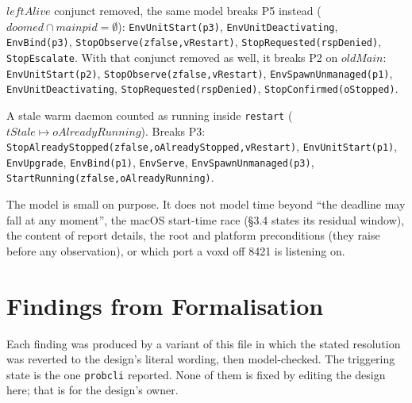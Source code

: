 \documentclass[a4paper,10pt,fleqn]{article}
\begin{document}
\begin{description}
    $leftAlive$ conjunct removed, the same model breaks P5 instead
    ($doomed \cap mainpid = \emptyset$): \texttt{EnvUnitStart(p3)},
    \texttt{EnvUnitDeactivating}, \texttt{EnvBind(p3)},
    \texttt{StopObserve(zfalse,vRestart)}, \texttt{StopRequested(rspDenied)},
    \texttt{StopEscalate}. With that conjunct removed as well, it breaks P2
    on $oldMain$: \texttt{EnvUnitStart(p2)},
    \texttt{StopObserve(zfalse,vRestart)}, \texttt{EnvSpawnUnmanaged(p1)},
    \texttt{EnvUnitDeactivating}, \texttt{StopRequested(rspDenied)},
    \texttt{StopConfirmed(oStopped)}.
  \item[P3] A stale warm daemon counted as running inside \texttt{restart}
    ($tStale \mapsto oAlreadyRunning$). Breaks P3:
    \texttt{StopAlreadyStopped(zfalse,oAlreadyStopped,vRestart)},
    \texttt{EnvUnitStart(p1)}, \texttt{EnvUpgrade}, \texttt{EnvBind(p1)},
    \texttt{EnvServe}, \texttt{EnvSpawnUnmanaged(p3)},
    \texttt{StartRunning(zfalse,oAlreadyRunning)}.
\end{description}

The model is small on purpose. It does not model time beyond ``the deadline
may fall at any moment'', the macOS start-time race (\S3.4 states its
residual window), the content of report details, the root and platform
preconditions (they raise before any observation), or which port a voxd off
8421 is listening on.

\section{Findings from Formalisation}
\label{sec:findings}

Each finding was produced by a variant of this file in which the stated
resolution was reverted to the design's literal wording, then model-checked.
The triggering state is the one \texttt{probcli} reported. None of them is
fixed by editing the design here; that is for the design's owner.
\end{document}
